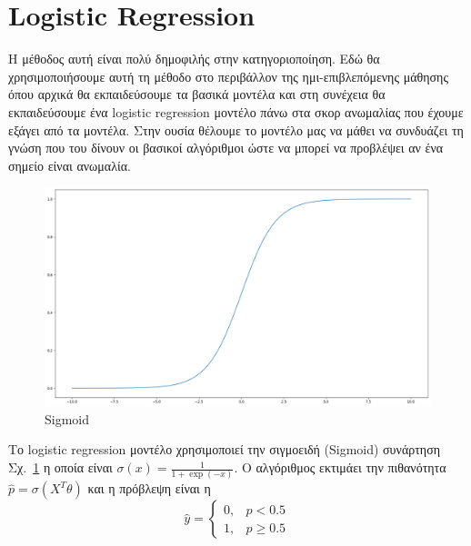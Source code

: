 \documentclass[a4paper,12pt]{report}
\theoremstyle{definitionNODot}
\begin{document}
	\section{Logistic Regression}
	Η μέθοδος αυτή είναι πολύ δημοφιλής στην κατηγοριοποίηση. Εδώ θα χρησιμοποιήσουμε αυτή τη μέθοδο στο περιβάλλον της ημι-επιβλεπόμενης μάθησης όπου αρχικά θα εκπαιδεύσουμε τα βασικά μοντέλα και στη συνέχεια θα εκπαιδεύσουμε ένα logistic regression μοντέλο πάνω στα σκορ ανωμαλίας που έχουμε εξάγει από τα μοντέλα. Στην ουσία θέλουμε το μοντέλο μας να μάθει να συνδυάζει τη γνώση που του δίνουν οι βασικοί αλγόριθμοι ώστε να μπορεί να προβλέψει αν ένα σημείο είναι ανωμαλία.
	
	\begin{figure}[h]
		\centering
		\includegraphics[width=\textwidth]{sigmoid.png}
		\caption{Sigmoid}
		\label{fig:sigmoid}
	\end{figure}
	
	Το logistic regression μοντέλο χρησιμοποιεί την σιγμοειδή (Sigmoid) συνάρτηση Σχ.~\ref{fig:sigmoid} η οποία είναι $\sigma(x) = \frac{1}{1+\exp(-x)}$. Ο αλγόριθμος εκτιμάει την πιθανότητα $\hat{p}=\sigma(X^T\theta)$ και η πρόβλεψη είναι η 
	\begin{equation*}
		\hat{y} = \begin{cases}
			0, &\hat{p}<0.5\\
			1, &\hat{p}\geq 0.5
		\end{cases}
	\end{equation*}
	
\end{document}
